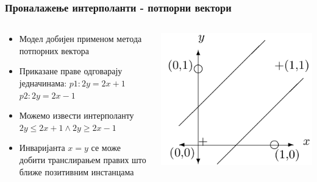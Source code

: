 \documentclass{beamer}
\begin{document}
\begin{frame}
\frametitle{Проналажење интерполанти - потпорни вектори}
\begin{columns}
\begin{column}{0.5\textwidth}
	\begin{itemize}
		\item Модел добијен применом метода потпорних вектора
		\item Приказане праве одговарају једначинама:
		$ p1: 2y = 2x + 1 $
		$ p2: 2y = 2x - 1 $
		\item Можемо извести интерполанту $ 2y \leq 2x + 1 \land 2y \geq 2x - 1 $
        \item Инваријанта $x=y$ се може добити транслирањем правих што ближе позитивним инстанцама
	\end{itemize}
\end{column}
\begin{column}{0.5\textwidth}  %
	\begin{center}
		\includegraphics[scale=0.22]{./slike/interpolant.png}
	\end{center}
\end{column}
\end{columns}
\end{frame}
\end{document}
